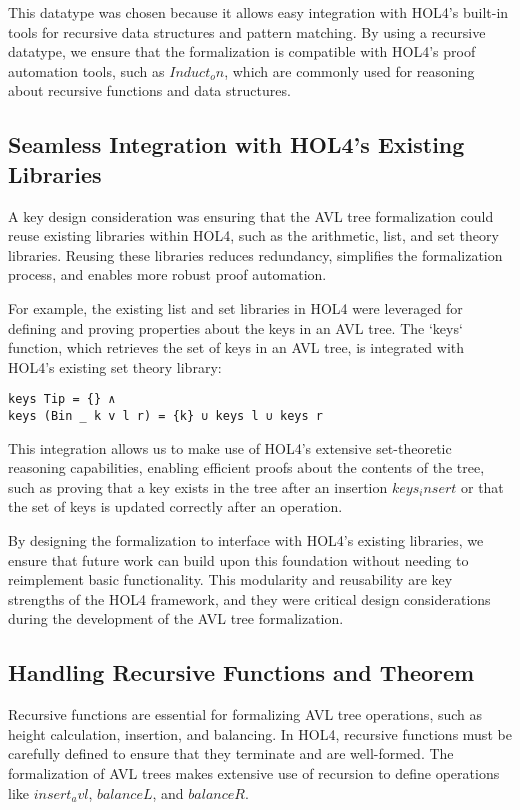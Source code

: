 \documentclass[12pt]{article}
\begin{document}
This datatype was chosen because it allows easy integration with HOL4’s built-in tools for recursive data structures and pattern matching. By using a recursive datatype, we ensure that the formalization is compatible with HOL4's proof automation tools, such as  \( Induct_on \), which are commonly used for reasoning about recursive functions and data structures.

\subsection{Seamless Integration with HOL4’s Existing Libraries}

A key design consideration was ensuring that the AVL tree formalization could reuse existing libraries within HOL4, such as the arithmetic, list, and set theory libraries. Reusing these libraries reduces redundancy, simplifies the formalization process, and enables more robust proof automation.

For example, the existing list and set libraries in HOL4 were leveraged for defining and proving properties about the keys in an AVL tree. The `keys` function, which retrieves the set of keys in an AVL tree, is integrated with HOL4’s existing set theory library:

\begin{verbatim}
keys Tip = {} ∧  
keys (Bin _ k v l r) = {k} ∪ keys l ∪ keys r
\end{verbatim}

This integration allows us to make use of HOL4’s extensive set-theoretic reasoning capabilities, enabling efficient proofs about the contents of the tree, such as proving that a key exists in the tree after an insertion \(keys_insert\) or that the set of keys is updated correctly after an operation.

By designing the formalization to interface with HOL4’s existing libraries, we ensure that future work can build upon this foundation without needing to reimplement basic functionality. This modularity and reusability are key strengths of the HOL4 framework, and they were critical design considerations during the development of the AVL tree formalization.

\subsection{Handling Recursive Functions and Theorem}

Recursive functions are essential for formalizing AVL tree operations, such as height calculation, insertion, and balancing. In HOL4, recursive functions must be carefully defined to ensure that they terminate and are well-formed. The formalization of AVL trees makes extensive use of recursion to define operations like \(insert_avl\), \(balanceL\), and \(balanceR\).
\end{document}
